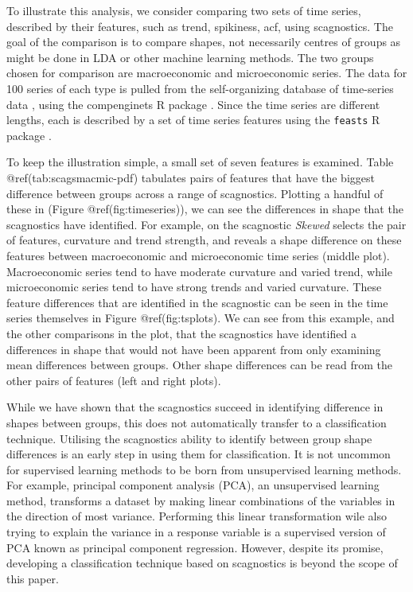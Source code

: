 To illustrate this analysis, we consider comparing two sets of time
series, described by their features, such as trend, spikiness, acf,
using scagnostics. The goal of the comparison is to compare shapes, not
necessarily centres of groups as might be done in LDA or other machine
learning methods. The two groups chosen for comparison are macroeconomic
and microeconomic series. The data for 100 series of each type is pulled
from the self-organizing database of time-series data \citep{sots},
using the compenginets R package \citep{compenginets}. Since the time
series are different lengths, each is described by a set of time series
features \citep[chapter 4 of][]{fpp} using the \texttt{feasts} R package
\citep{feasts}.

To keep the illustration simple, a small set of seven features is
examined. Table @ref(tab:scagsmacmic-pdf) tabulates pairs of features
that have the biggest difference between groups across a range of
scagnostics. Plotting a handful of these in (Figure
@ref(fig:timeseries)), we can see the differences in shape that the
scagnostics have identified. For example, on the scagnostic
\emph{Skewed} selects the pair of features, curvature and trend
strength, and reveals a shape difference on these features between
macroeconomic and microeconomic time series (middle plot). Macroeconomic
series tend to have moderate curvature and varied trend, while
microeconomic series tend to have strong trends and varied curvature.
These feature differences that are identified in the scagnostic can be
seen in the time series themselves in Figure @ref(fig:tsplots). We can
see from this example, and the other comparisons in the plot, that the
scagnostics have identified a differences in shape that would not have
been apparent from only examining mean differences between groups. Other
shape differences can be read from the other pairs of features (left and
right plots).

While we have shown that the scagnostics succeed in identifying
difference in shapes between groups, this does not automatically
transfer to a classification technique. Utilising the scagnostics
ability to identify between group shape differences is an early step in
using them for classification. It is not uncommon for supervised
learning methods to be born from unsupervised learning methods. For
example, principal component analysis (PCA), an unsupervised learning
method, transforms a dataset by making linear combinations of the
variables in the direction of most variance. Performing this linear
transformation wile also trying to explain the variance in a response
variable is a supervised version of PCA known as principal component
regression. However, despite its promise, developing a classification
technique based on scagnostics is beyond the scope of this paper.


